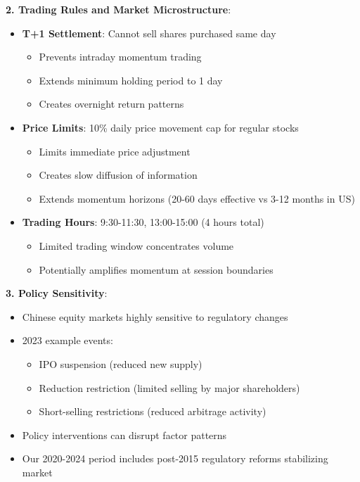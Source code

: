 \textbf{2. Trading Rules and Market Microstructure}:
\begin{itemize}
    \item \textbf{T+1 Settlement}: Cannot sell shares purchased same day
    \begin{itemize}
        \item Prevents intraday momentum trading
        \item Extends minimum holding period to 1 day
        \item Creates overnight return patterns
    \end{itemize}
    \item \textbf{Price Limits}: 10\% daily price movement cap for regular stocks
    \begin{itemize}
        \item Limits immediate price adjustment
        \item Creates slow diffusion of information
        \item Extends momentum horizons (20-60 days effective vs 3-12 months in US)
    \end{itemize}
    \item \textbf{Trading Hours}: 9:30-11:30, 13:00-15:00 (4 hours total)
    \begin{itemize}
        \item Limited trading window concentrates volume
        \item Potentially amplifies momentum at session boundaries
    \end{itemize}
\end{itemize}

\textbf{3. Policy Sensitivity}:
\begin{itemize}
    \item Chinese equity markets highly sensitive to regulatory changes
    \item 2023 example events:
    \begin{itemize}
        \item IPO suspension (reduced new supply)
        \item Reduction restriction (limited selling by major shareholders)
        \item Short-selling restrictions (reduced arbitrage activity)
    \end{itemize}
    \item Policy interventions can disrupt factor patterns
    \item Our 2020-2024 period includes post-2015 regulatory reforms stabilizing market
\end{itemize}

